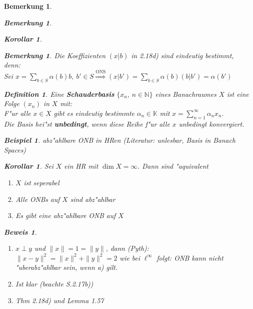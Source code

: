 \documentclass[a4paper,11pt]{book}
\newcommand{\N}{{\mathbb N}}
\newcommand{\K}{{\mathbb K}}
\newcommand{\begriff}[1]{\textbf{#1}} %
\newtheorem*{DefNO}{Definition}
\newtheorem{Kor}[Def]{Korollar}
\newtheorem*{BspNO}{Beispiel}
\newtheorem*{BemNO}{Bemerkung}
\newtheorem{Bem}[Def]{Bemerkung}
\theoremstyle{nonumberplain}
\newtheorem{Bew}{Beweis}
\begin{document}
\begin{Bem}
\begin{BemNO}
\begin{Kor}
\begin{Bem}
Die Koeffizienten $(x|b)$ in 2.18d) sind eindeutig bestimmt, denn:\\
Sei $x = \sum_{b \in S} \alpha(b) b,\ b' \in S \stackrel{\text{ONS}}{\Rightarrow} (x|b') = \sum_{b \in S} \alpha(b)(b|b') = \alpha(b')$ \eb
\end{Bem}


\begin{DefNO}
Eine \begriff{Schauderbasis} $\{x_n,\ n \in \N\}$ eines Banachraumes $X$ ist eine Folge $(x_n)$ in $X$ mit:\\
F"ur alle $x \in X$ gibt es eindeutig bestimmte $\alpha_n \in \K$ mit $x = \sum_{n=1}^{\infty} \alpha_n x_n$.\\
Die Basis hei"st \begriff{unbedingt}, wenn diese Reihe f"ur alle $x$ unbedingt konvergiert.
\end{DefNO}


\begin{BspNO}
abz"ahlbare ONB in HRen (Literatur: unlesbar, Basis in Banach Spaces)
\end{BspNO}



\begin{Kor}
Sei $X$ ein HR mit $\dim X = \infty$. Dann sind "aquivalent
\begin{enumerate}
\item[a)] $X$ ist seperabel

\item[b)] Alle ONBs auf $X$ sind abz"ahlbar

\item[c)] Es gibt eine abz"ahlbare ONB auf $X$
\end{enumerate}
\end{Kor}


\begin{Bew}
\begin{enumerate}
\item[a) $\Rightarrow$ b)] $x \perp y$ und $\|x\| = 1 = \|y\|$, dann (Pyth): $\|x-y\|^2 = \|x\|^2 + \|y\|^2 = 2$ wie bei $\ell^{\infty}$ folgt: ONB kann nicht "uberabz"ahlbar sein, wenn a) gilt.

\item[b) $\Rightarrow$ c)] Ist klar (beachte S.2.17b))

\item[c) $\Rightarrow$ a)] Thm 2.18d) und Lemma 1.57
\end{enumerate}
\end{Bew}



\end{Kor}
\end{BemNO}
\end{Bem}
\end{document}

